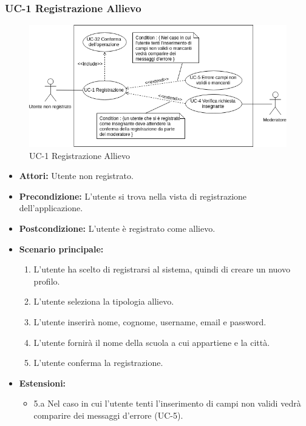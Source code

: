 \subsubsection{UC-1 Registrazione Allievo}
\begin{figure}[h]
	\centering
	\includegraphics[scale=0.7]{images/UC-1.png}
	\caption{UC-1 Registrazione Allievo}
\end{figure}	

\begin{itemize}
		\item \textbf{Attori: }Utente non registrato.
		\item \textbf{Precondizione: }L'utente si trova nella vista di registrazione dell'applicazione.
		\item \textbf{Postcondizione: }L'utente è registrato come allievo.
		\item \textbf{Scenario principale: }
		\begin{enumerate}
		\item L'utente ha scelto di registrarsi al sistema, quindi di creare un nuovo profilo. 
		\item L'utente seleziona la tipologia allievo. 
		\item L'utente inserirà nome, cognome, username, email e password.
		\item L'utente fornirà il nome della scuola a cui appartiene e la città.
		\item L'utente conferma la registrazione.
		\end{enumerate}
		\item \textbf{Estensioni: }
		\begin{itemize}
			\item 5.a Nel caso in cui l'utente tenti l'inserimento di campi non validi vedrà comparire dei messaggi d'errore (UC-5).
		\end{itemize}
	\end{itemize}

